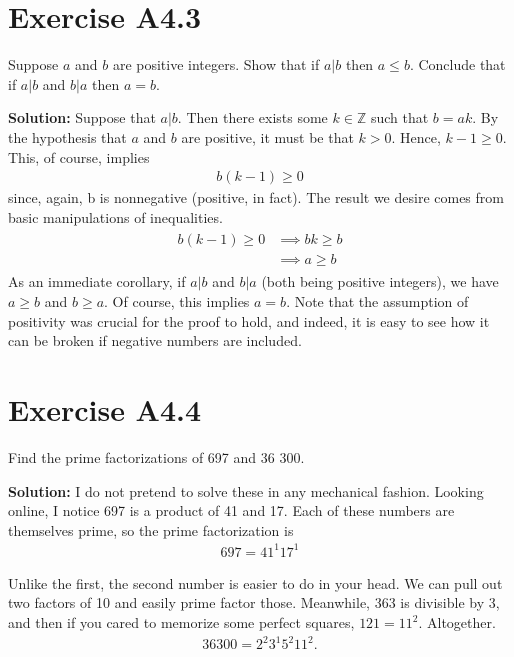 \documentclass{book}
\begin{document}
\section*{Exercise A4.3} 
    Suppose $a$ and $b$ are positive integers. Show that if $a|b$ then $a\leq b$. Conclude that if $a|b$ and $b|a$ then $a=b$.
    
    \textbf{Solution:} Suppose that $a|b$. Then there exists some $k\in \mathbb{Z}$ such that $b = ak$. By the hypothesis that $a$ and $b$ are positive, it must be that $k>0$. Hence, $k-1\geq0$. This, of course, implies
    \begin{align}
        b(k-1) \geq 0
    \end{align}
    since, again, b is nonnegative (positive, in fact). The result we desire comes from basic manipulations of inequalities.
    \begin{align}
    \begin{aligned}
        b(k-1) \geq 0 &\implies bk \geq b \\
        &\implies a \geq b
    \end{aligned}
    \end{align}
    As an immediate corollary, if $a|b$ and $b|a$ (both being positive integers), we have $a\geq b$ and $b\geq a$. Of course, this implies $a = b$. Note that the assumption of positivity was crucial for the proof to hold, and indeed, it is easy to see how it can be broken if negative numbers are included.

\section*{Exercise A4.4}
    Find the prime factorizations of 697 and 36 300.
    
    \textbf{Solution:} I do not pretend to solve these in any mechanical fashion. Looking online, I notice 697 is a product of 41 and 17. Each of these numbers are themselves prime, so the prime factorization is 
    \begin{align}
        697 =41^1 17^1
    \end{align}
    
    Unlike the first, the second number is easier to do in your head. We can pull out two factors of 10 and easily prime factor those. Meanwhile, 363 is divisible by 3, and then if you cared to memorize some perfect squares, $121= 11^2$. Altogether.
    \begin{align}
        36300 = 2^2 3^1 5^2 11^2.
    \end{align}
\end{document}
